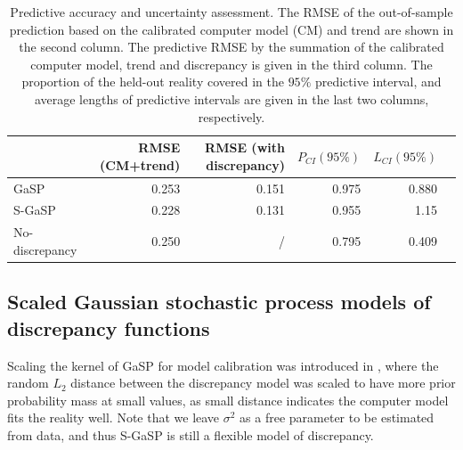 \begin{table}[t]
\begin{center}
\begin{tabular}{lrrrrr}
  \hline
 & RMSE (CM+trend) &RMSE (with discrepancy)&$P_{CI}(95\%)$ & $L_{CI}(95\%)$    \\
  \hline
  GaSP           &{0.253}&0.151 &{0.975}&{0.880}  \\
  S-GaSP           &{0.228}& 0.131&{0.955} &1.15  \\
  No-discrepancy           &{0.250}&/&{0.795}  &0.409 \\
  \hline
\end{tabular}
\end{center}
   \caption{Predictive accuracy and uncertainty assessment. The RMSE of the out-of-sample prediction based on the calibrated  computer model (CM) and trend are shown in the second column. The predictive RMSE by the summation of the calibrated  computer model, trend and discrepancy is given in the third column. The proportion of the held-out reality covered in the $95\%$ predictive interval, and average lengths of predictive intervals are given in the last two columns, respectively.    }

   \label{tab:prediction_bayarri_2007}
\end{table}


\subsection{Scaled Gaussian stochastic process models of discrepancy functions}
Scaling the kernel of GaSP for model calibration was introduced in \cite{gu2018sgasp}, where the  random $L_2$ distance between the discrepancy model was scaled to have more prior probability mass at small values, as small distance  indicates the computer model fits the reality well. Note that we leave $\sigma^2$ as a free parameter to be estimated from data, and thus S-GaSP is still a flexible model of discrepancy.

